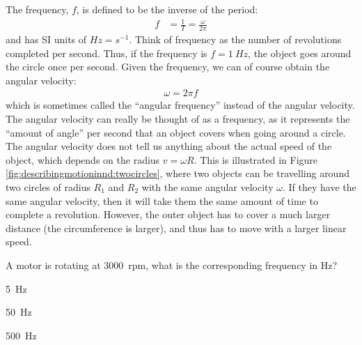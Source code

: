 The frequency, $f$, is defined to be the inverse of the period:
\begin{align*}
f&=\frac{1}{T}=\frac{\omega}{2\pi}
\end{align*}
and has SI units of $\si{Hz}=\si{s^{-1}}$. Think of frequency as the number of revolutions completed per second. Thus, if the frequency is $f=\SI{1}{Hz}$, the object goes around the circle once per second. Given the frequency, we can of course obtain the angular velocity:
\begin{align*}
\omega = 2\pi f
\end{align*}
which is sometimes called the ``angular frequency'' instead of the angular velocity. The angular velocity can really be thought of as a frequency, as it represents the ``amount of angle'' per second that an object covers when going around a circle. The angular velocity does not tell us anything about the actual speed of the object, which depends on the radius $v=\omega R$. This is illustrated in Figure \ref{fig:describingmotioninnd:twocircles}, where two objects can be travelling around two circles of radius $R_1$ and $R_2$ with the same angular velocity $\omega$. If they have the same angular velocity, then it will take them the same amount of time to complete a revolution. However, the outer object has to cover a much larger distance (the circumference is larger), and thus has to move with a larger linear speed.
\begin{checkpoint}{\begin{MCquestion}{A motor is rotating at \SI{3000}{rpm}, what is the corresponding frequency in \si{Hz}?}
\item \SI{5}{Hz}
\item \SI{50}{Hz}%
\item \SI{500}{Hz}
\end{MCquestion}}
\end{checkpoint}

